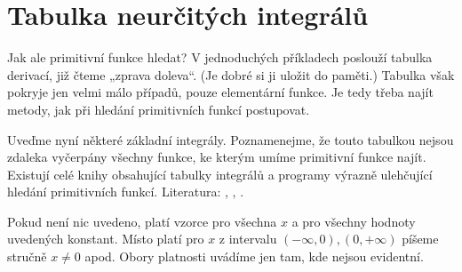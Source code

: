   \section{Tabulka neurčitých integrálů}\label{MA:chap_tabINT}
    Jak ale primitivní funkce hledat? V jednoduchých příkladech poslouží tabulka derivací, již čteme
    „zprava doleva“. (Je dobré si ji uložit do paměti.) Tabulka však pokryje jen velmi málo případů,
    pouze elementární funkce. Je tedy třeba najít metody, jak při hledání primitivních funkcí
    postupovat.

    Uveďme nyní některé základní integrály. Poznamenejme, že touto tabulkou nejsou zdaleka vyčerpány
    všechny funkce, ke kterým umíme primitivní funkce najít. Existují celé knihy obsahující tabulky
    integrálů a programy výrazně ulehčující hledání primitivních funkcí. Literatura:
    \cite{Rektorys1963}, \cite{Brabec1989}, \cite{diblik2002}. 

    Pokud není nic uvedeno, platí vzorce pro všechna \(x\) a pro všechny hodnoty uvedených konstant.
    Místo platí pro \(x\) z intervalu \((-\infty,0),(0,+\infty)\) píšeme stručně \(x\neq0\) apod.
    Obory platnosti uvádíme jen tam, kde nejsou evidentní.  

